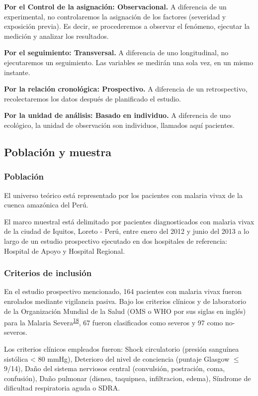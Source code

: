 \documentclass[]{article}
\begin{document}
\textbf{Por el Control de la asignación: Observacional.} A diferencia de
un experimental, no controlaremos la asignación de los factores
(severidad y exposición previa). Es decir, se procederemos a observar el
fenómeno, ejecutar la medición y analizar los resultados.

\textbf{Por el seguimiento: Transversal.} A diferencia de uno
longitudinal, no ejecutaremos un seguimiento. Las variables se medirán
una sola vez, en un mismo instante.

\textbf{Por la relación cronológica: Prospectivo.} A diferencia de un
retrospectivo, recolectaremos los datos después de planificado el
estudio.

\textbf{Por la unidad de análisis: Basado en individuo.} A diferencia de
uno ecológico, la unidad de observación son individuos, llamados aquí
pacientes.

\subsection{Población y muestra}\label{poblacion-y-muestra}

\subsubsection{Población}\label{poblacion}

El universo teórico está representado por los pacientes con malaria
vivax de la cuenca amazónica del Perú.

El marco muestral está delimitado por pacientes diagnosticados con
malaria vivax de la ciudad de Iquitos, Loreto - Perú, entre enero del
2012 y junio del 2013 a lo largo de un estudio prospectivo ejecutado en
dos hospitales de referencia: Hospital de Apoyo y Hospital Regional.

\subsubsection{Criterios de inclusión}\label{criterios-de-inclusion}

En el estudio prospectivo mencionado, 164 pacientes con malaria vivax
fueron enrolados mediante vigilancia pasiva. Bajo los criterios clínicos
y de laboratorio de la Organización Mundial de la Salud (OMS o WHO por
sus siglas en inglés) para la Malaria
Severa\textsuperscript{\protect\hyperlink{ref-WHO2014severe}{18}}, 67
fueron clasificados como severos y 97 como no-severos.

Los criterios clínicos empleados fueron: Shock circulatorio (presión
sanguínea sistólica \textless{} 80 mmHg), Deterioro del nivel de
conciencia (puntaje Glasgow \(\le\) 9/14), Daño del sistema nerviosos
central (convulsión, postración, coma, confusión), Daño pulmonar
(disnea, taquipnea, infiltracion, edema), Síndrome de dificultad
respiratoria aguda o SDRA.
\end{document}
